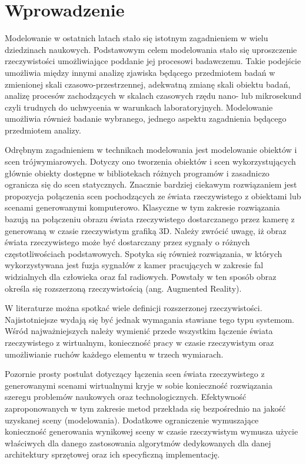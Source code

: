 \chapter{Wprowadzenie}
\label{cha:wprowadzenie}

\par
Modelowanie w ostatnich latach stało się istotnym zagadnieniem w wielu dziedzinach naukowych. Podstawowym celem modelowania stało się uproszczenie rzeczywistości umożliwiające poddanie jej procesowi badawczemu. Takie podejście umożliwia między innymi analizę zjawiska będącego przedmiotem badań w zmienionej skali czasowo-przestrzennej, adekwatną zmianę skali obiektu badań, analizę procesów zachodzących w skalach czasowych rzędu nano- lub mikrosekund czyli trudnych do uchwycenia w warunkach laboratoryjnych. Modelowanie umożliwia również badanie wybranego, jednego aspektu zagadnienia będącego przedmiotem analizy.
\par
Odrębnym zagadnieniem w technikach modelowania jest modelowanie obiektów i scen trójwymiarowych. Dotyczy ono tworzenia obiektów i scen wykorzystujących głównie obiekty dostępne w bibliotekach różnych programów i zasadniczo ogranicza się do scen statycznych. Znacznie bardziej ciekawym rozwiązaniem jest propozycja połączenia scen pochodzących ze świata rzeczywistego z obiektami lub scenami generowanymi komputerowo. Klasyczne w tym zakresie rozwiązania bazują na połączeniu obrazu świata rzeczywistego dostarczanego przez kamerę z generowaną w czasie rzeczywistym grafiką 3D. Należy zwrócić uwagę, iż obraz świata rzeczywistego może być dostarczany przez sygnały o różnych częstotliwościach podstawowych. Spotyka się również rozwiązania, w których wykorzystywana jest fuzja sygnałów z kamer pracujących w zakresie fal widzialnych dla człowieka oraz fal radiowych. Powstały w ten sposób obraz określa się rozszerzoną rzeczywistością (ang. Augmented Reality).
\par
W literaturze można spotkać wiele definicji rozszerzonej rzeczywistości. Najistotniejsze wydają się być jednak wymagania stawiane tego typu systemom. Wśród najważniejszych należy wymienić przede wszystkim łączenie świata rzeczywistego z wirtualnym, konieczność pracy w czasie rzeczywistym oraz umożliwianie ruchów każdego elementu w trzech wymiarach.
\par
Pozornie prosty postulat dotyczący łączenia scen świata rzeczywistego z generowanymi scenami wirtualnymi kryje w sobie konieczność rozwiązania szeregu problemów naukowych oraz technologicznych. Efektywność zaproponowanych w tym zakresie metod przekłada się bezpośrednio na jakość uzyskanej sceny (modelowania). Dodatkowe ograniczenie wymuszające konieczność generowania wynikowej sceny w czasie rzeczywistym wymusza użycie właściwych dla danego zastosowania algorytmów dedykowanych dla danej architektury sprzętowej oraz ich specyficzną implementację.

